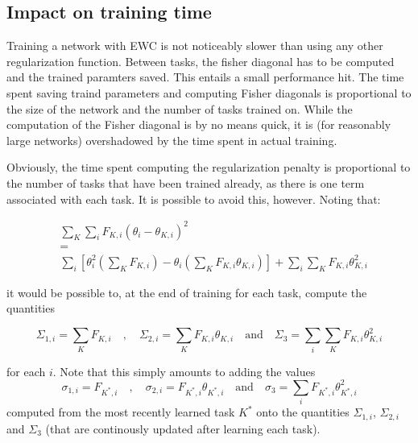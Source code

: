 \documentclass{article}
\begin{document}
        \subsection*{Impact on training time}
            Training a network with EWC is not noticeably slower than using any 
            other regularization function. Between tasks, the fisher diagonal 
            has to be computed and the trained paramters saved. This entails a 
            small performance hit. The time spent saving traind parameters 
            and computing Fisher diagonals is proportional to the size of the 
            network and the number of tasks trained on. While the computation 
            of the Fisher diagonal is by no means quick, it is 
            (for reasonably large networks) overshadowed by the time spent in
            actual training.
            
            Obviously, the time spent computing the regularization penalty is 
            proportional to the number of tasks that have been trained already, 
            as there is one term associated with each task. It is possible to 
            avoid this, however. Noting that:

            \begin{equation*}
                \begin{split}
                & \sum_{K}{\sum_{i}{F_{K,i}(\theta_i - \theta_{K,i})^2}} \\ &= \\
                &    \sum_{i}{
                        \left[\theta_i^2\left({\sum_{K}{F_{K,i}}}\right) -  
                        \theta_i \left(\sum_{K}{F_{K,i}\theta_{K,i}}\right)\right]} + 
                        \sum_{i}{\sum_{K}{F_{K,i}\theta_{K,i}^2}} 
                \end{split}
            \end{equation*}

            it would be possible to, at the end of training for each task, 
            compute the quantities 

            \begin{equation*}
                \Sigma_{1,i} = \sum_{K}{F_{K,i}}\quad, \quad
                \Sigma_{2,i} = \sum_{K}{F_{K,i}\theta_{K,i}}\quad \text{and} \quad
                \Sigma_3 = \sum_{i}\sum_{K}{F_{K,i}\theta_{K,i}^2}
            \end{equation*}
            
            for each $i$. Note that this simply amounts to adding the values 
            \begin{equation*}
                \sigma_{1,i} = F_{K^*,i}\quad, \quad
                \sigma_{2,i} = F_{K^*,i}\theta_{K^*,i}\quad \text{and} \quad
                \sigma_3 = \sum_{i}{F_{K^*,i}\theta_{K^*,i}^2}
            \end{equation*}
            computed from the most recently learned task $K^*$ onto the 
            quantities $\Sigma_{1,i}$, $\Sigma_{2,i}$ and $\Sigma_3$ 
            (that are continously updated after learning each task).
\end{document}
